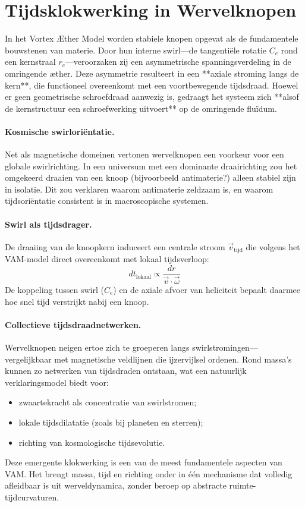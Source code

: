 \section{Tijdsklokwerking in Wervelknopen}

In het Vortex Æther Model worden stabiele knopen opgevat als de fundamentele bouwstenen van materie. Door hun interne swirl—de tangentiële rotatie \( C_e \) rond een kernstraal \( r_c \)—veroorzaken zij een asymmetrische spanningsverdeling in de omringende æther. Deze asymmetrie resulteert in een **axiale stroming langs de kern**, die functioneel overeenkomt met een voortbewegende tijdsdraad. Hoewel er geen geometrische schroefdraad aanwezig is, gedraagt het systeem zich **alsof de kernstructuur een schroefwerking uitvoert** op de omringende fluïdum.

\paragraph{Kosmische swirloriëntatie.}
Net als magnetische domeinen vertonen wervelknopen een voorkeur voor een globale swirlrichting. In een universum met een dominante draairichting zou het omgekeerd draaien van een knoop (bijvoorbeeld antimaterie?) alleen stabiel zijn in isolatie. Dit zou verklaren waarom antimaterie zeldzaam is, en waarom tijdsoriëntatie consistent is in macroscopische systemen.

\paragraph{Swirl als tijdsdrager.}
De draaiing van de knoopkern induceert een centrale stroom \( \vec{v}_\text{tijd} \) die volgens het VAM-model direct overeenkomt met lokaal tijdsverloop:
\[
    dt_{\text{lokaal}} \propto \frac{dr}{\vec{v} \cdot \vec{\omega}}
\]
De koppeling tussen swirl (\( C_e \)) en de axiale afvoer van heliciteit bepaalt daarmee hoe snel tijd verstrijkt nabij een knoop.

\paragraph{Collectieve tijdsdraadnetwerken.}
Wervelknopen neigen ertoe zich te groeperen langs swirlstromingen—vergelijkbaar met magnetische veldlijnen die ijzervijlsel ordenen. Rond massa’s kunnen zo netwerken van tijdsdraden ontstaan, wat een natuurlijk verklaringsmodel biedt voor:
\begin{itemize}
    \item zwaartekracht als concentratie van swirlstromen;
    \item lokale tijdsdilatatie (zoals bij planeten en sterren);
    \item richting van kosmologische tijdsevolutie.
\end{itemize}

Deze emergente klokwerking is een van de meest fundamentele aspecten van VAM. Het brengt massa, tijd en richting onder in één mechanisme dat volledig afleidbaar is uit werveldynamica, zonder beroep op abstracte ruimte-tijdcurvaturen.